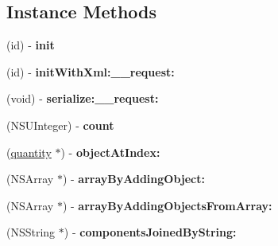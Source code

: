 \subsection*{Instance Methods}
\begin{DoxyCompactItemize}
\item 
\hypertarget{interfaceget_quantities_response_afdce09b71a529838135693f1317037ee}{}(id) -\/ {\bfseries init}\label{interfaceget_quantities_response_afdce09b71a529838135693f1317037ee}

\item 
\hypertarget{interfaceget_quantities_response_abf61f2f19fa6ad91630c723a3629308b}{}(id) -\/ {\bfseries init\+With\+Xml\+:\+\_\+\+\_\+request\+:}\label{interfaceget_quantities_response_abf61f2f19fa6ad91630c723a3629308b}

\item 
\hypertarget{interfaceget_quantities_response_a774c80bdc16b81d918c807d359580323}{}(void) -\/ {\bfseries serialize\+:\+\_\+\+\_\+request\+:}\label{interfaceget_quantities_response_a774c80bdc16b81d918c807d359580323}

\item 
\hypertarget{interfaceget_quantities_response_a5da796f5c3b3b9f6ff5fd5281dab62bf}{}(N\+S\+U\+Integer) -\/ {\bfseries count}\label{interfaceget_quantities_response_a5da796f5c3b3b9f6ff5fd5281dab62bf}

\item 
\hypertarget{interfaceget_quantities_response_a5bd41710d9db775e583e9c92793f54d4}{}(\hyperlink{interfacequantity}{quantity} $\ast$) -\/ {\bfseries object\+At\+Index\+:}\label{interfaceget_quantities_response_a5bd41710d9db775e583e9c92793f54d4}

\item 
\hypertarget{interfaceget_quantities_response_adf7eaaa2ec0043684e484abf2d976e8b}{}(N\+S\+Array $\ast$) -\/ {\bfseries array\+By\+Adding\+Object\+:}\label{interfaceget_quantities_response_adf7eaaa2ec0043684e484abf2d976e8b}

\item 
\hypertarget{interfaceget_quantities_response_aa9aa14a7645ee0149b2f3ef1e117c7ee}{}(N\+S\+Array $\ast$) -\/ {\bfseries array\+By\+Adding\+Objects\+From\+Array\+:}\label{interfaceget_quantities_response_aa9aa14a7645ee0149b2f3ef1e117c7ee}

\item 
\hypertarget{interfaceget_quantities_response_a20964dd247e3013fb25b61613c86f5d3}{}(N\+S\+String $\ast$) -\/ {\bfseries components\+Joined\+By\+String\+:}\label{interfaceget_quantities_response_a20964dd247e3013fb25b61613c86f5d3}


\end{DoxyCompactItemize}
